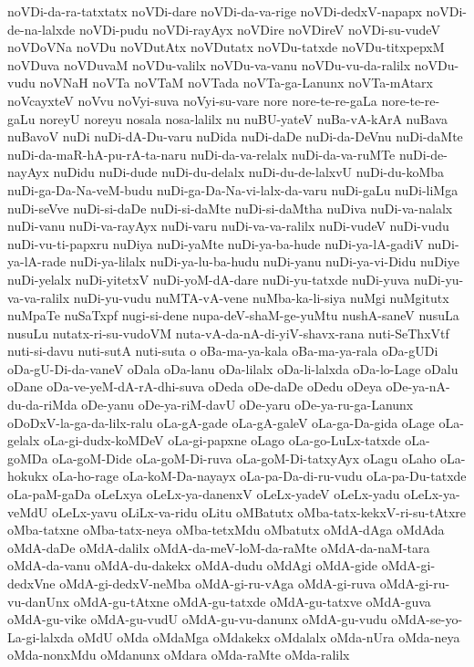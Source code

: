 {noVDi-da-ra-tatxtatx
noVDi-dare
noVDi-da-va-rige
noVDi-dedxV-napapx
noVDi-de-na-lalxde
noVDi-pudu
noVDi-rayAyx
noVDire
noVDireV
noVDi-su-vudeV
noVDoVNa
noVDu
noVDutAtx
noVDutatx
noVDu-tatxde
noVDu-titxpepxM
noVDuva
noVDuvaM
noVDu-valilx
noVDu-va-vanu
noVDu-vu-da-ralilx
noVDu-vudu
noVNaH
noVTa
noVTaM
noVTada
noVTa-ga-Lanunx
noVTa-mAtarx
noVcayxteV
noVvu
noVyi-suva
noVyi-su-vare
nore
nore-te-re-gaLa
nore-te-re-gaLu
noreyU
noreyu
nosala
nosa-lalilx
nu
nuBU-yateV
nuBa-vA-kArA
nuBava
nuBavoV
nuDi
nuDi-dA-Du-varu
nuDida
nuDi-daDe
nuDi-da-DeVnu
nuDi-daMte
nuDi-da-maR-hA-pu-rA-ta-naru
nuDi-da-va-relalx
nuDi-da-va-ruMTe
nuDi-de-nayAyx
nuDidu
nuDi-dude
nuDi-du-delalx
nuDi-du-de-lalxvU
nuDi-du-koMba
nuDi-ga-Da-Na-veM-budu
nuDi-ga-Da-Na-vi-lalx-da-varu
nuDi-gaLu
nuDi-liMga
nuDi-seVve
nuDi-si-daDe
nuDi-si-daMte
nuDi-si-daMtha
nuDiva
nuDi-va-nalalx
nuDi-vanu
nuDi-va-rayAyx
nuDi-varu
nuDi-va-va-ralilx
nuDi-vudeV
nuDi-vudu
nuDi-vu-ti-papxru
nuDiya
nuDi-yaMte
nuDi-ya-ba-hude
nuDi-ya-lA-gadiV
nuDi-ya-lA-rade
nuDi-ya-lilalx
nuDi-ya-lu-ba-hudu
nuDi-yanu
nuDi-ya-vi-Didu
nuDiye
nuDi-yelalx
nuDi-yitetxV
nuDi-yoM-dA-dare
nuDi-yu-tatxde
nuDi-yuva
nuDi-yu-va-va-ralilx
nuDi-yu-vudu
nuMTA-vA-vene
nuMba-ka-li-siya
nuMgi
nuMgitutx
nuMpaTe
nuSaTxpf
nugi-si-dene
nupa-deV-shaM-ge-yuMtu
nushA-saneV
nusuLa
nusuLu
nutatx-ri-su-vudoVM
nuta-vA-da-nA-di-yiV-shavx-rana
nuti-SeThxVtf
nuti-si-davu
nuti-sutA
nuti-suta
o
oBa-ma-ya-kala
oBa-ma-ya-rala
oDa-gUDi
oDa-gU-Di-da-vaneV
oDala
oDa-lanu
oDa-lilalx
oDa-li-lalxda
oDa-lo-Lage
oDalu
oDane
oDa-ve-yeM-dA-rA-dhi-suva
oDeda
oDe-daDe
oDedu
oDeya
oDe-ya-nA-du-da-riMda
oDe-yanu
oDe-ya-riM-davU
oDe-yaru
oDe-ya-ru-ga-Lanunx
oDoDxV-la-ga-da-lilx-ralu
oLa-gA-gade
oLa-gA-galeV
oLa-ga-Da-gida
oLage
oLa-gelalx
oLa-gi-dudx-koMDeV
oLa-gi-papxne
oLago
oLa-go-LuLx-tatxde
oLa-goMDa
oLa-goM-Dide
oLa-goM-Di-ruva
oLa-goM-Di-tatxyAyx
oLagu
oLaho
oLa-hokukx
oLa-ho-rage
oLa-koM-Da-nayayx
oLa-pa-Da-di-ru-vudu
oLa-pa-Du-tatxde
oLa-paM-gaDa
oLeLxya
oLeLx-ya-danenxV
oLeLx-yadeV
oLeLx-yadu
oLeLx-ya-veMdU
oLeLx-yavu
oLiLx-va-ridu
oLitu
oMBatutx
oMba-tatx-kekxV-ri-su-tAtxre
oMba-tatxne
oMba-tatx-neya
oMba-tetxMdu
oMbatutx
oMdA-dAga
oMdAda
oMdA-daDe
oMdA-dalilx
oMdA-da-meV-loM-da-raMte
oMdA-da-naM-tara
oMdA-da-vanu
oMdA-du-dakekx
oMdA-dudu
oMdAgi
oMdA-gide
oMdA-gi-dedxVne
oMdA-gi-dedxV-neMba
oMdA-gi-ru-vAga
oMdA-gi-ruva
oMdA-gi-ru-vu-danUnx
oMdA-gu-tAtxne
oMdA-gu-tatxde
oMdA-gu-tatxve
oMdA-guva
oMdA-gu-vike
oMdA-gu-vudU
oMdA-gu-vu-danunx
oMdA-gu-vudu
oMdA-se-yo-La-gi-lalxda
oMdU
oMda
oMdaMga
oMdakekx
oMdalalx
oMda-nUra
oMda-neya
oMda-nonxMdu
oMdanunx
oMdara
oMda-raMte
oMda-ralilx
}
